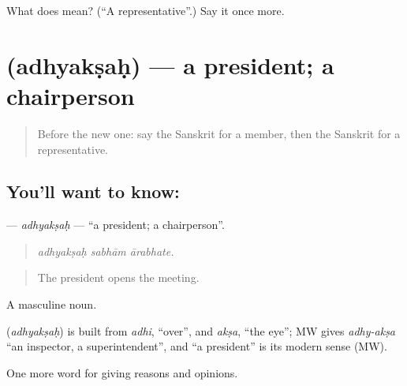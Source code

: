 \begin{tcolorbox}[breakable,colback=teal!4,colframe=teal!35!black,title={Before you move on}]
What does  mean? (\textquotedblleft{}A representative\textquotedblright{}.) Say it once more.
\end{tcolorbox}
\section[\texorpdfstring{\sk{अध्यक्षः} (adhyakṣaḥ)}{अध्यक्षः (adhyakṣaḥ)}]{ (adhyakṣaḥ) — a president; a chairperson}

\label{lesson:SA-C355-adhyaksah}



\begin{quote}
Before the new one: say the Sanskrit for a member, then the Sanskrit for a representative.
\end{quote}

\subsection*{You'll want to know: }
\textbf{} — \emph{adhyakṣaḥ} — \textquotedblleft{}a president; a chairperson\textquotedblright{}.

\begin{quote}
  
\end{quote}

\begin{quote}
\emph{adhyakṣaḥ sabhām ārabhate.}
\end{quote}

\begin{quote}
The president opens the meeting.
\end{quote}

A masculine noun.

\begin{cousinweb}
\textbf{} (\emph{adhyakṣaḥ}) is built from \emph{adhi}, \textquotedblleft{}over\textquotedblright{}, and \emph{akṣa}, \textquotedblleft{}the eye\textquotedblright{}; MW gives \emph{adhy-akṣa} \textquotedblleft{}an inspector, a superintendent\textquotedblright{}, and \textquotedblleft{}a president\textquotedblright{} is its modern sense (MW).
\end{cousinweb}

\begin{grammarlens}[title={What you've built}]
One more word for giving reasons and opinions.
\end{grammarlens}

